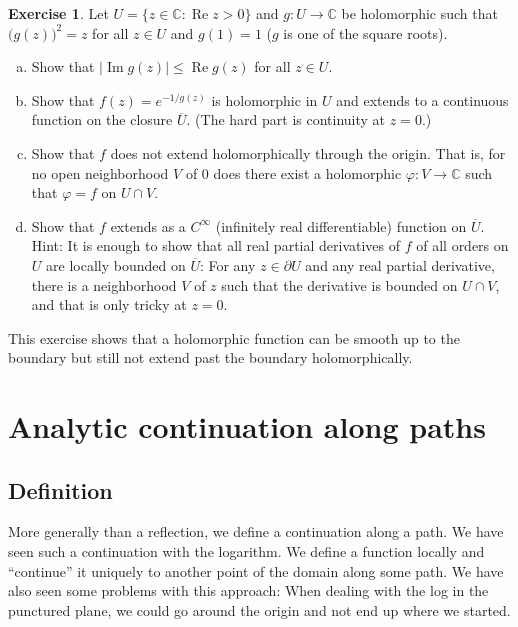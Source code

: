 \documentclass[12pt,openany]{book}
\newcommand{\widebar}[1]{\overline{#1}}
\renewcommand{\Re}{\operatorname{Re}}
\renewcommand{\Im}{\operatorname{Im}}
\newcommand{\sabs}[1]{\lvert {#1} \rvert}
\newcommand{\C}{{\mathbb{C}}}
\newcommand{\myquote}[1]{``#1''}
\theoremstyle{plain}
\theoremstyle{remark}
\theoremstyle{definition}
\newenvironment{exbox}{%
    \def\FrameCommand{\vrule width 1pt \relax\hspace{10pt}}%
    \MakeFramed{\advance\hsize-\width\FrameRestore}%
}{%
    \endMakeFramed
}
\newenvironment{exparts}{%
    \leavevmode\begin{enumerate}[a),noitemsep,topsep=0pt,parsep=0pt,partopsep=0pt]
}{%
    \end{enumerate}
}
\theoremstyle{exercise}
\newtheorem{exercise}{Exercise}[section]
\theoremstyle{example}
\begin{document}
\begin{exbox}
\begin{exercise}
Let $U = \{ z \in \C : \Re z > 0 \}$ and
$g \colon U  \to \C$ be holomorphic
such that ${\bigl(g(z)\bigr)}^2 = z$ for
all $z \in U$ and $g(1) = 1$ ($g$ is one of the square roots).
\begin{exparts}
\item
Show that
$\sabs{\Im g(z)} \leq \Re g(z)$
for all $z \in U$.
\item
Show that $f(z) = e^{-1/g(z)}$ is holomorphic in $U$
and extends to a continuous function on the closure
$\widebar{U}$.  (The hard part is continuity at $z=0$.)
\item
Show that $f$ does not extend holomorphically through the
origin.  That is, for no open neighborhood $V$ of $0$ does there
exist a holomorphic
$\varphi \colon V \to \C$ such that $\varphi = f$ on $U \cap V$.
\item
Show that $f$ extends as a
$C^\infty$ (infinitely real differentiable) function on $\widebar{U}$.
Hint: It is enough to show that
all real partial derivatives of $f$ of all orders on $U$
are locally bounded on $\widebar{U}$: For any $z \in \partial U$ 
and any real partial derivative,
there is a neighborhood $V$ of $z$ such that the derivative
is bounded on $U \cap V$, and that is only tricky at $z=0$.
\end{exparts}
This exercise shows that a
holomorphic function can be smooth up to the
boundary but still not extend past the boundary holomorphically.
\end{exercise}
\end{exbox}


\section{Analytic continuation along paths}
\label{sec:analcontelts}

\subsection{Definition}

More generally than a reflection, we define a continuation along a path.
We have seen such a continuation with
the logarithm.  We define a function locally and \myquote{continue} it
uniquely to another point of the domain along some path.
We have also seen some problems with this approach:
When dealing with the log in the punctured plane, we could go around the origin
and not end up where we started.
\end{document}
